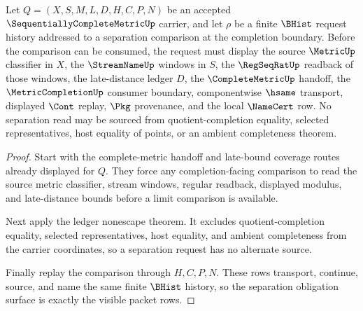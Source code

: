 \begin{theorem}
\label{thm:sequentially-complete-metric-separation-obligations}
Let $Q=(X,S,M,L,D,H,C,P,N)$ be an accepted $\SequentiallyCompleteMetricUp$ carrier, and let $\rho$ be a finite $\BHist$ request history addressed to a separation comparison at the completion boundary. Before the comparison can be consumed, the request must display the source $\MetricUp$ classifier in $X$, the $\StreamNameUp$ windows in $S$, the $\RegSeqRatUp$ readback of those windows, the late-distance ledger $D$, the $\CompleteMetricUp$ handoff, the $\MetricCompletionUp$ consumer boundary, componentwise $\hsame$ transport, displayed $\Cont$ replay, $\Pkg$ provenance, and the local $\NameCert$ row. No separation read may be sourced from quotient-completion equality, selected representatives, host equality of points, or an ambient completeness theorem.
\end{theorem}
\begin{proof}
Start with the complete-metric handoff and late-bound coverage routes already displayed for $Q$. They force any completion-facing comparison to read the source metric classifier, stream windows, regular readback, displayed modulus, and late-distance bounds before a limit comparison is available.

Next apply the ledger nonescape theorem. It excludes quotient-completion equality, selected representatives, host equality, and ambient completeness from the carrier coordinates, so a separation request has no alternate source.

Finally replay the comparison through $H,C,P,N$. These rows transport, continue, source, and name the same finite $\BHist$ history, so the separation obligation surface is exactly the visible packet rows.
\end{proof}

